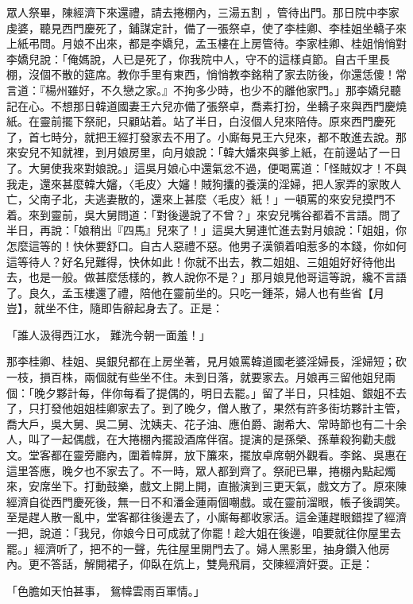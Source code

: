 \begin{showcontents}{}
眾人祭畢，陳經濟下來還禮，請去捲棚內，三湯五割 ，管待出門。那日院中李家虔婆，聽見西門慶死了，鋪謀定計，備了一張祭卓，使了李桂卿、李桂姐坐轎子來上紙弔問。月娘不出來，都是李嬌兒，孟玉樓在上房管待。李家桂卿、桂姐悄悄對李嬌兒說：「俺媽說，人已是死了，你我院中人，守不的這樣貞節。自古千里長棚，沒個不散的筵席。教你手里有東西，悄悄教李銘稍了家去防後，你還恁傻！常言道：『楊州雖好，不久戀之家。』不拘多少時，也少不的離他家門。」那李嬌兒聽記在心。不想那日韓道國妻王六兒亦備了張祭卓，喬素打扮，坐轎子來與西門慶燒紙。在靈前擺下祭祀，只顧站着。站了半日，白沒個人兒來陪侍。原來西門慶死了，首七時分，就把王經打發家去不用了。小廝每見王六兒來，都不敢進去說。那來安兒不知就裡，到月娘房里，向月娘說：「韓大嬏來與爹上紙，在前邊站了一日了。大舅使我來對娘說。」這吳月娘心中還氣忿不過，便喝罵道：「怪賊奴才！不與我走，還來甚麼韓大嬸，〈毛皮〉大嬸！賊狗攮的養漢的淫婦，把人家弄的家敗人亡，父南子北，夫逃妻散的，還來上甚麼〈毛皮〉紙！」一頓罵的來安兒摸門不着。來到靈前，吳大舅問道：「對後邊說了不曾？」來安兒嘴谷都着不言語。問了半日，再說：「娘稍出『四馬』兒來了！」這吳大舅連忙進去對月娘說：「姐姐，你怎麼這等的！快休要舒口。自古人惡禮不惡。他男子漢領着咱惹多的本錢，你如何這等待人？好名兒難得，快休如此！你就不出去，教二姐姐、三姐姐好好待他出去，也是一般。做甚麼恁樣的，教人說你不是？」那月娘見他哥這等說，纔不言語了。良久，孟玉樓還了禮，陪他在靈前坐的。只吃一鍾茶，婦人也有些省【月豈】，就坐不住，隨即告辭起身去了。正是：

「誰人汲得西江水，  難洗今朝一面羞！」

那李桂卿、桂姐、吳銀兒都在上房坐著，見月娘罵韓道國老婆淫婦長，淫婦短；砍一枝，損百株，兩個就有些坐不住。未到日落，就要家去。月娘再三留他姐兒兩個：「晚夕夥計每，伴你每看了提偶的，明日去罷。」留了半日，只桂姐、銀姐不去了，只打發他姐姐桂卿家去了。到了晚夕，僧人散了，果然有許多街坊夥計主管，喬大戶，吳大舅、吳二舅、沈姨夫、花子油、應伯爵、謝希大、常時節也有二十余人，叫了一起偶戲，在大捲棚內擺設酒席伴宿。提演的是孫榮、孫華殺狗勸夫戲文。堂客都在靈旁廳內，圍着幃屏，放下簾來，擺放卓席朝外觀看。李銘、吳惠在這里答應，晚夕也不家去了。不一時，眾人都到齊了。祭祀已畢，捲棚內點起燭來，安席坐下。打動鼓樂，戲文上開上開，直搬演到三更天氣，戲文方了。原來陳經濟自從西門慶死後，無一日不和潘金蓮兩個嘲戲。或在靈前溜眼，帳子後調笑。至是趕人散一亂中，堂客都往後邊去了，小廝每都收家活。這金蓮趕眼錯捏了經濟一把，說道：「我兒，你娘今日可成就了你罷！趁大姐在後邊，咱要就往你屋里去罷。」經濟听了，把不的一聲，先往屋里開門去了。婦人黑影里，抽身鑽入他房內。更不答話，解開裙子，仰臥在炕上，雙鳧飛肩，交陳經濟奸耍。正是：

「色膽如天怕甚事，  鴛幃雲雨百軍情。」


\end{showcontents}
